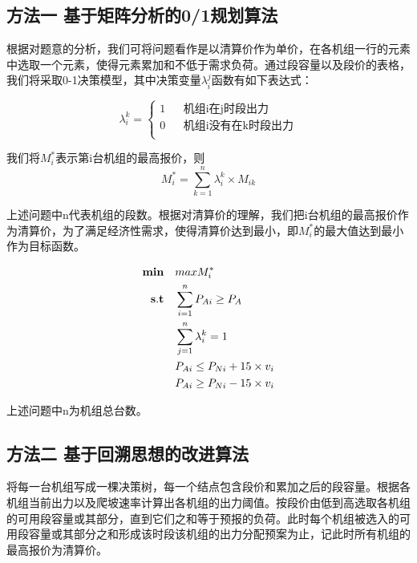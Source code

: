 \documentclass[12pt,a4paper]{ctexart}
\begin{document}
	\subsection*{方法一 \space  基于矩阵分析的0/1规划算法}
	根据对题意的分析，我们可将问题看作是以清算价作为单价，在各机组一行的元素中选取一个元素，使得元素累加和不低于需求负荷。通过段容量以及段价的表格，我们将采取0-1决策模型，其中决策变量$\lambda_{i}^{j}$函数有如下表达式：
	
	$$ \lambda_{i}^{k}=\left\{
	\begin{array}{rcl}
		1       &      & {\text{机组i在j时段出力}}\\
		0       &      & {\text{机组i没有在k时段出力}}\\
	\end{array} \right. $$
	
	我们将$M_{i}^{*}$表示第i台机组的最高报价，则
	\begin{equation}
		M_{i}^{*}=\sum_{k=1}^{n} \lambda_{i}^{k} \times M_{ik} 
	\end{equation}
	
	上述问题中n代表机组的段数。根据对清算价的理解，我们把i台机组的最高报价作为清算价，为了满足经济性需求，使得清算价达到最小，即$M_{i}^{*}$的最大值达到最小作为目标函数。
	
	\begin{equation*}
		\begin{split}
			{\bf min}\quad & max M_{i}^{*}\\
			{\bf s.t}\quad &\sum_{i=1}^{n}P_{Ai} \ge P_{A}\\
			&\sum_{j=1}^{n} \lambda_{i}^{k} =1\\
			&P_{Ai} \le P_{Ni} + 15\times v_{i} \\
			&P_{Ai} \ge P_{Ni} - 15\times v_{i} \\
		\end{split}
	\end{equation*}
	
	上述问题中n为机组总台数。
	\subsection*{方法二 \space 基于回溯思想的改进算法}
	
	将每一台机组写成一棵决策树，每一个结点包含段价和累加之后的段容量。根据各机组当前出力以及爬坡速率计算出各机组的出力阈值。按段价由低到高选取各机组的可用段容量或其部分，直到它们之和等于预报的负荷。此时每个机组被选入的可用段容量或其部分之和形成该时段该机组的出力分配预案为止，记此时所有机组的最高报价为清算价。
	
\end{document}
